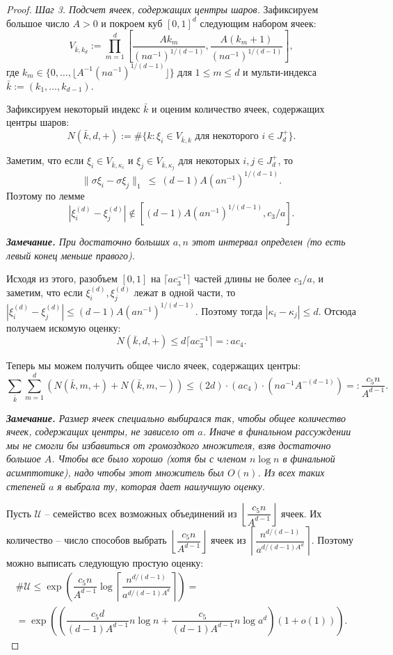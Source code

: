 \documentclass[12pt]{article}
\theoremstyle{plain}
\theoremstyle{definition}
\theoremstyle{remark}
\def\leq{\leqslant}
\begin{document}
\begin{proof}
{\it Шаг 3. Подсчет ячеек, содержащих центры шаров.} 
Зафиксируем большое число $A > 0$ и покроем куб $[0, 1]^d$ следующим набором ячеек: $$V_{\bar k, k_d} := \prod_{m = 1}^d\left[\dfrac{Ak_m}{(na^{-1})^{1/(d-1)}}, \dfrac{A(k_m+1)}{(na^{-1})^{1/(d-1)}}\right],$$
где $k_m\in \{0, \ldots, \lfloor A^{-1}(na^{-1})^{1/(d-1)}\rfloor\}$ для $1\leq m \leq d$ и мульти-индекса $\bar k := (k_1, \ldots, k_{d-1}).$

Зафиксируем некоторый индекс $\bar k$ и оценим количество ячеек, содержащих центры шаров: $$N(\bar k, d, +):= \#\{k\colon \xi_i\in V_{\bar k, k} \text{ для некоторого } i\in J_d^+\}.$$

Заметим, что если $\xi_i\in V_{\bar k, \kappa_i}$ и $\xi_j\in V_{\bar k, \kappa_j}$ для некоторых $i, j\in J_d^+$, то $$\|\sigma\xi_i - \sigma\xi_j\|_1~\leq~(d-1)A(an^{-1})^{1/(d-1)}.$$ 
Поэтому по лемме $$|\xi_i^{(d)} - \xi_j^{(d)}| \not\in [(d-1)A(an^{-1})^{1/(d-1)}, c_3/a].$$

{\it {\bf Замечание.} При достаточно больших $a, n$ этот интервал определен (то есть левый конец меньше правого).}

Исходя из этого, разобъем $[0,1]$ на $\lceil ac_3^{-1}\rceil$ частей длины не более $c_3/a$, и заметим, что если $\xi_i^{(d)}, \xi_j^{(d)}$ лежат в одной части, то $|\xi_i^{(d)} - \xi_j^{(d)}| \leq (d-1)A(an^{-1})^{1/(d-1)}$. Поэтому тогда $|\kappa_i - \kappa_j|\leq d$. Отсюда получаем искомую оценку: $$N(\bar k, d, +)\leq d \lceil ac_3^{-1}\rceil =: ac_4.$$

Теперь мы можем получить общее число ячеек, содержащих центры: $$\sum_{\bar k}\sum_{m=1}^d (N(\bar k, m, +) + N(\bar k, m, -))\leq (2d)\cdot(ac_4)\cdot (na^{-1}A^{-(d-1)}) =: \dfrac{c_5 n}{A^{d-1}}.$$

{\it {\bf Замечание.} Размер ячеек специально выбирался так, чтобы общее количество ячеек, содержащих центры, не зависело от $a$. Иначе в финальном рассуждении мы не смогли бы избавиться от громоздкого множителя, взяв достаточно большое $A$. Чтобы все было хорошо (хотя бы с членом $n\log n$ в финальной асимптотике), надо чтобы этот множитель был $O(n)$. Из всех таких степеней $a$ я выбрала ту, которая дает наилучшую оценку.} 

Пусть $\mathcal{U}$ -- семейство всех возможных объединений из $\left\lfloor \dfrac{c_5 n}{A^{d-1}}\right\rfloor$ ячеек. Их количество -- число способов выбрать $\left\lfloor \dfrac{c_5 n}{A^{d-1}}\right\rfloor$ ячеек из $\left\lceil \dfrac{n^{d/(d-1)}}{a^{d/(d-1)A^d}}\right\rceil$. Поэтому можно выписать следующую простую оценку: \begin{multline*}
    \#\mathcal{U}\leq \exp \left(\dfrac{c_5 n}{A^{d-1}} \log \left\lceil \dfrac{n^{d/(d-1)}}{a^{d/(d-1)A^d}}\right\rceil \right) = \\
    =\exp \left(\left(\dfrac{c_5d}{(d-1)A^{d-1}}n\log n + \dfrac{c_5}{(d-1)A^{d-1}}n\log a^d\right)(1+o(1))\right).
\end{multline*}{}


\end{proof}
\end{document}
